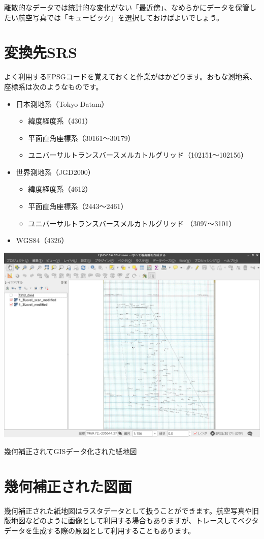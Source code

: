 \documentclass[14Q,twocolumn]{jsarticle}
\makeatletter
\newenvironment{figurehere}
  {\def\@captype{figure}}
  {}
\makeatother
\begin{document}
離散的なデータでは統計的な変化がない「最近傍」、なめらかにデータを保管したい航空写真では「キュービック」を選択しておけばよいでしょう。

\section{変換先SRS}
よく利用するEPSGコードを覚えておくと作業がはかどります。おもな測地系、座標系は次のようなものです。
\begin{itemize}
\item 日本測地系（Tokyo Datam）
	\begin{itemize}
	\item 緯度経度系（4301）
	\item 平面直角座標系（30161〜30179）
	\item ユニバーサルトランスバースメルカトルグリッド（102151〜102156）
	\end{itemize}
\item 世界測地系（JGD2000）
	\begin{itemize}
	\item 緯度経度系（4612）
	\item 平面直角座標系（2443〜2461）
	\item ユニバーサルトランスバースメルカトルグリッド （3097〜3101）
	\end{itemize}
\item WGS84（4326）
\end{itemize}

\begin{figurehere}
\centering
\includegraphics[width=0.8\linewidth]{16.png}
\caption{幾何補正されてGISデータ化された紙地図}
\end{figurehere}

\section{幾何補正された図面}
幾何補正された紙地図はラスタデータとして扱うことができます。航空写真や旧版地図などのように画像として利用する場合もありますが、トレースしてベクタデータを生成する際の原図として利用することもあります。
\end{document}
